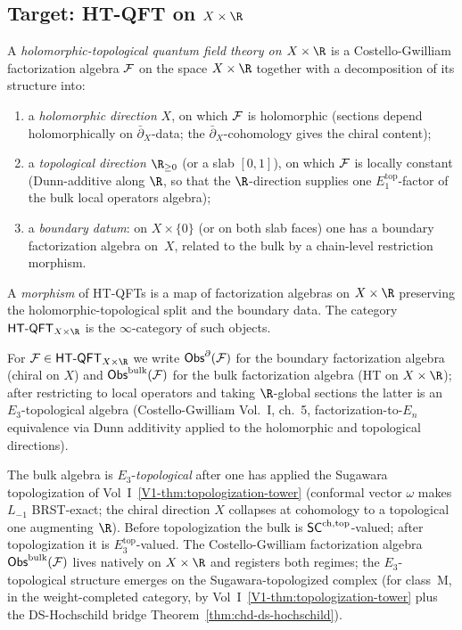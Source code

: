 \subsection{Target: HT-QFT on $X \times \R$}

\begin{definition}
\label{def:uhf-ht-qft-factorization}
A \emph{holomorphic-topological quantum field theory on
$X \times \R$} is a Costello-Gwilliam factorization algebra
$\mathcal{F}$ on the space $X \times \R$ together with a decomposition of
its structure into:
\begin{enumerate}[label=\textup{(\roman*)}]
\item a \emph{holomorphic direction} $X$, on which $\mathcal{F}$ is
 holomorphic (sections depend holomorphically on
 $\bar\partial_X$-data; the $\bar\partial_X$-cohomology gives the
 chiral content);
\item a \emph{topological direction} $\R_{\ge0}$ \textup{(}or a slab
 $[0,1]$\textup{)}, on which $\mathcal{F}$ is
 locally constant (Dunn-additive along $\R$, so that the
 $\R$-direction supplies one $E_1^{\mathrm{top}}$-factor of the
 bulk local operators algebra);
\item a \emph{boundary datum}: on $X\times\{0\}$ \textup{(}or on both
 slab faces\textup{)} one has a boundary factorization algebra on~$X$,
 related to the bulk by a chain-level restriction morphism.
\end{enumerate}
A \emph{morphism} of HT-QFTs is a map of factorization algebras on
$X \times \R$ preserving the holomorphic-topological split and the
boundary data. The category $\HTQFT_{X \times \R}$ is the
$\infty$-category of such objects.

For $\cF \in \HTQFT_{X \times \R}$ we write $\mathsf{Obs}^\partial(\mathcal{F})$ for
the boundary factorization algebra (chiral on $X$) and
$\mathsf{Obs}^{\mathrm{bulk}}(\mathcal{F})$ for the bulk factorization algebra
(HT on $X \times \R$); after restricting to local operators and
taking $\R$-global sections the latter is an $E_3$-topological
algebra (Costello-Gwilliam Vol.~I, ch.~5, factorization-to-$E_n$
equivalence via Dunn additivity applied to the holomorphic and
topological directions).
\end{definition}

\begin{remark}
\label{rem:uhf-e3-scope}
The bulk algebra is $E_3$-\emph{topological} after one has
applied the Sugawara topologization of Vol~I~\ref*{V1-thm:topologization-tower}
(conformal vector $\omega$ makes $L_{-1}$ BRST-exact; the chiral
direction $X$ collapses at cohomology to a topological one
augmenting $\R$). Before topologization the bulk is
$\mathsf{SC}^{\mathrm{ch},\mathrm{top}}$-valued; after topologization it is
$E_3^{\mathrm{top}}$-valued. The Costello-Gwilliam factorization
algebra $\mathsf{Obs}^{\mathrm{bulk}}(\mathcal{F})$ lives natively on $X \times \R$
and registers both regimes; the $E_3$-topological structure
emerges on the Sugawara-topologized complex (for class~M, in the
weight-completed category, by Vol~I~\ref*{V1-thm:topologization-tower}
plus the DS-Hochschild bridge
Theorem~\ref*{thm:chd-ds-hochschild}).
\end{remark}

